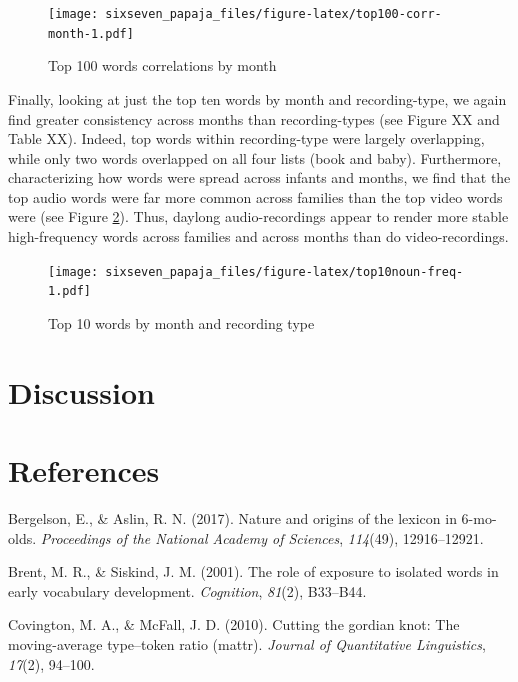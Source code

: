\documentclass[floatsintext,man]{apa6}
\theoremstyle{definition}
\theoremstyle{definition}
\theoremstyle{definition}
\theoremstyle{remark}
\begin{document}
\begin{figure}[htbp]
\centering
\texttt{[image: sixseven\_papaja\_files/figure-latex/top100-corr-month-1.pdf]}
\caption{\label{fig:top100-corr-month}Top 100 words correlations by month}
\end{figure}

Finally, looking at just the top ten words by month and recording-type,
we again find greater consistency across months than recording-types
(see Figure XX and Table XX). Indeed, top words within recording-type
were largely overlapping, while only two words overlapped on all four
lists (book and baby). Furthermore, characterizing how words were spread
across infants and months, we find that the top audio words were far
more common across families than the top video words were (see Figure
\ref{fig:top10noun-freq}). Thus, daylong audio-recordings appear to
render more stable high-frequency words across families and across
months than do video-recordings.

\begin{figure}[htbp]
\centering
\texttt{[image: sixseven\_papaja\_files/figure-latex/top10noun-freq-1.pdf]}
\caption{\label{fig:top10noun-freq}Top 10 words by month and recording type}
\end{figure}

\section{Discussion}\label{discussion}

\newpage

\section{References}\label{references}

\setlength{\parindent}{-0.5in} \setlength{\leftskip}{0.5in}

\hypertarget{refs}{}
\hypertarget{ref-bergelson2017nature}{}
Bergelson, E., \& Aslin, R. N. (2017). Nature and origins of the lexicon
in 6-mo-olds. \emph{Proceedings of the National Academy of Sciences},
\emph{114}(49), 12916--12921.

\hypertarget{ref-brent2001role}{}
Brent, M. R., \& Siskind, J. M. (2001). The role of exposure to isolated
words in early vocabulary development. \emph{Cognition}, \emph{81}(2),
B33--B44.

\hypertarget{ref-covington2010cutting}{}
Covington, M. A., \& McFall, J. D. (2010). Cutting the gordian knot: The
moving-average type--token ratio (mattr). \emph{Journal of Quantitative
Linguistics}, \emph{17}(2), 94--100.
\end{document}
